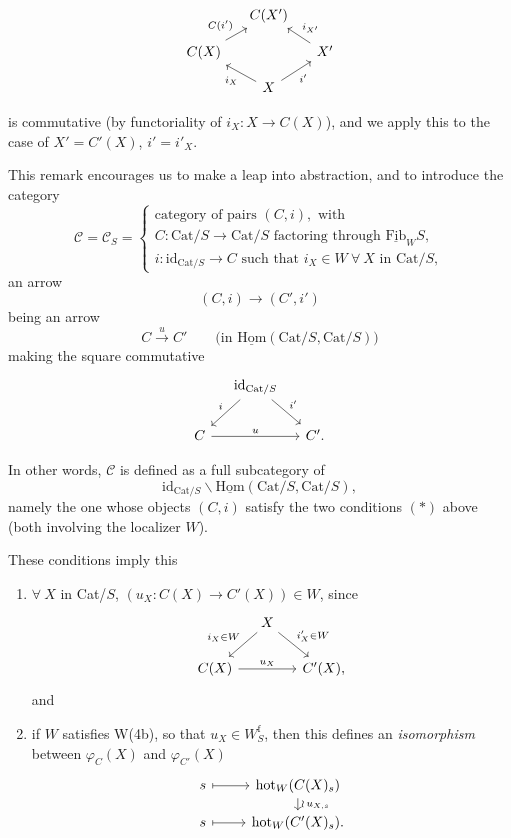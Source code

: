 \documentclass[11pt]{article}
\newcommand{\printedpage}[1]{\marginpar{\footnotesize p.~#1}}
\newcommand{\msp}[1]{\marginpar{\footnotesize [#1]}}
\newcommand{\Hom}{\underline{\mathrm{Hom}}}
\newcommand{\Fib}{\underline{\mathrm{Fib}}}
\newcommand{\Cat}{\mathrm{Cat}}
\newcommand{\hot}{\mathrm{hot}}
\newcommand{\id}{\mathrm{id}}
\begin{document}
\printedpage{130}

\[
\begin{tikzcd}[column sep=small, row sep=small]
 & C(X') & \\
C(X) \arrow[ur, "C(i')"] & & X' \arrow[ul, "i_{X'}"'] \\
 & X \arrow[ul, "i_X"] \arrow[ur, "i'"'] &
\end{tikzcd}
\]

is commutative (by functoriality of $i_X : X \longrightarrow C(X)$), and we apply this to the case of $X' = C'(X)$, $i' = i'_X$.

This remark encourages us to make a leap into abstraction, and to introduce the category\msp{page 198}
\[
\mathcal{C} = \mathcal{C}_S = \begin{cases}
\text{category of pairs } (C,i), \text{ with} \\
C : \Cat/S \longrightarrow \Cat/S \text{ factoring through } \Fib_W S, \\
i : \id_{\Cat/S} \longrightarrow C \text{ such that } i_X \in W \ \forall\ X \text{ in } \Cat/S,
\end{cases}
\tag*{$(*)$}
\]
an arrow
\[
(C,i) \longrightarrow (C',i')
\]
being an arrow
\[
C \xrightarrow{u} C' \qquad \text{(in } \Hom(\Cat/S, \Cat/S))
\]
making the square commutative
\[
\begin{tikzcd}[column sep=small]
 & \id_{\Cat/S} \arrow[dl, "i"'] \arrow[dr, "i'"] & \\
C \arrow[rr, "u"] & & C'.
\end{tikzcd}
\]

In other words, $\mathcal{C}$ is defined as a full subcategory of %
\[
\id_{\Cat/S}\backslash\Hom(\Cat/S, \Cat/S),
\]
namely the one whose objects $(C,i)$ satisfy the two conditions $(*)$ above (both involving the localizer $W$).

\msp{page 199}These conditions imply this

\begin{enumerate}
\item[a)] $\forall\ X$ in Cat/$S$, $(u_X : C(X) \longrightarrow C'(X)) \in W$, since
\[
\begin{tikzcd}[column sep=small]
 & X \arrow[dl, "i_X\in W"'] \arrow[dr, "i'_X\in W"] & \\
C(X) \arrow[rr, "u_X"] & & C'(X),
\end{tikzcd}
\]
\printedpage{131}
and

\item[b)] if $W$ satisfies W(4b), so that $u_X \in W^{\mathrm{f}}_S$, then this defines an \textit{isomorphism} between $\varphi_C(X)$ and $\varphi_{C'}(X)$ %
\[
\begin{tikzcd}[row sep=small]
s \arrow[r, mapsto] & \hot_W(C(X)_s) \arrow[d, "\wr\, u_{X,s}"] \\
s \arrow[r, mapsto] & \hot_W(C'(X)_s).
\end{tikzcd}
\]
\end{enumerate}
\end{document}
